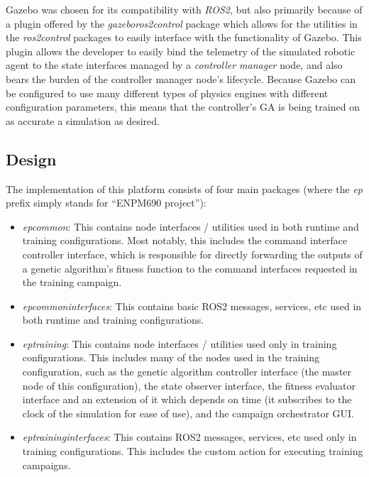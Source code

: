 \documentclass[conference]{IEEEtran}
\begin{document}
	Gazebo was chosen for its compatibility with \textit{ROS2}, but also primarily because of a plugin offered by the \textit{gazebo\textunderscore ros2\textunderscore control} package \cite{gazebo-ros2-control} which allows for the utilities in the \textit{ros2\textunderscore control} packages to easily interface with the functionality of Gazebo. This plugin allows the developer to easily bind the telemetry of the simulated robotic agent to the state interfaces managed by a \textit{controller manager} node, and also bears the burden of the controller manager node's lifecycle. Because Gazebo can be configured to use many different types of physics engines with different configuration parameters, this means that the controller's \ac{GA} is being trained on as accurate a simulation as desired.

	\subsection{Design}

	The implementation of this platform consists of four main packages \cite{git-repo} (where the \textit{ep} prefix simply stands for ``ENPM690 project''):
	\begin{itemize}
		\item \textit{ep\textunderscore common}: This contains node interfaces / utilities used in both runtime and training configurations. Most notably, this includes the command interface controller interface, which is responsible for directly forwarding the outputs of a genetic algorithm's fitness function to the command interfaces requested in the training campaign.
		\item \textit{ep\textunderscore common\textunderscore interfaces}: This contains basic ROS2 messages, services, etc used in both runtime and training configurations.
		\item \textit{ep\textunderscore training}: This contains node interfaces / utilities used only in training configurations. This includes many of the nodes used in the training configuration, such as the genetic algorithm controller interface (the master node of this configuration), the state observer interface, the fitness evaluator interface and an extension of it which depends on time (it subscribes to the clock of the simulation for ease of use), and the campaign orchestrator GUI.
		\item \textit{ep\textunderscore training\textunderscore interfaces}: This contains ROS2 messages, services, etc used only in training configurations. This includes the custom action for executing training campaigns.
	\end{itemize}
\end{document}
